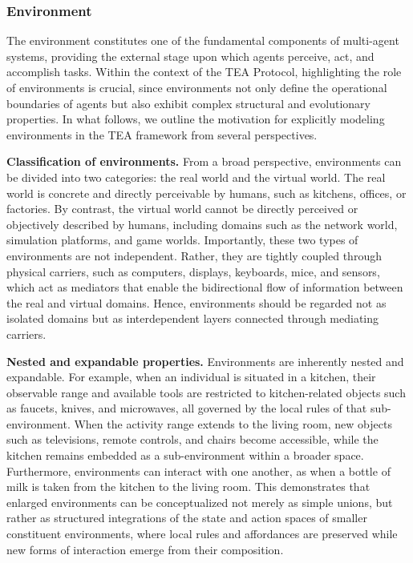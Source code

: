 \documentclass[11pt]{article}
\begin{document}
\subsubsection{Environment}

The environment constitutes one of the fundamental components of multi-agent systems, providing the external stage upon which agents perceive, act, and accomplish tasks. Within the context of the TEA Protocol, highlighting the role of environments is crucial, since environments not only define the operational boundaries of agents but also exhibit complex structural and evolutionary properties. In what follows, we outline the motivation for explicitly modeling environments in the TEA framework from several perspectives.  

\textbf{Classification of environments.} From a broad perspective, environments can be divided into two categories: the real world and the virtual world. The real world is concrete and directly perceivable by humans, such as kitchens, offices, or factories. By contrast, the virtual world cannot be directly perceived or objectively described by humans, including domains such as the network world, simulation platforms, and game worlds. Importantly, these two types of environments are not independent. Rather, they are tightly coupled through physical carriers, such as computers, displays, keyboards, mice, and sensors, which act as mediators that enable the bidirectional flow of information between the real and virtual domains. Hence, environments should be regarded not as isolated domains but as interdependent layers connected through mediating carriers.  

\textbf{Nested and expandable properties.} Environments are inherently nested and expandable. For example, when an individual is situated in a kitchen, their observable range and available tools are restricted to kitchen-related objects such as faucets, knives, and microwaves, all governed by the local rules of that sub-environment. When the activity range extends to the living room, new objects such as televisions, remote controls, and chairs become accessible, while the kitchen remains embedded as a sub-environment within a broader space. Furthermore, environments can interact with one another, as when a bottle of milk is taken from the kitchen to the living room. This demonstrates that enlarged environments can be conceptualized not merely as simple unions, but rather as structured integrations of the state and action spaces of smaller constituent environments, where local rules and affordances are preserved while new forms of interaction emerge from their composition.
\end{document}
